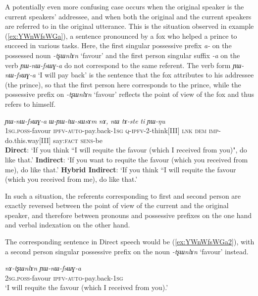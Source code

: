 \documentclass[oneside,a4paper,11pt]{article}
\newcommand{\ipa}[1]{\textit{\phon#1}}
\newcommand{\jpg}[2]{\ipa{#1} `#2'}
\newcommand{\bleu}[1]{{\color{blue}#1}}
\newcommand{\rouge}[1]{{\color{red}#1}}
\newcommand{\refb}[1]{(\ref{#1})}
\begin{document}
A potentially even more confusing case occurs when the original speaker is the current speakers' addressee, and when both the original and the current speakers are referred to in the original utterance. This is the situation observed in example \refb{ex:YWnWfsWGa}, a sentence pronounced by a fox who helped a prince to succeed in various tasks. Here,  the first singular possessive prefix \ipa{a-} on the possessed noun \jpg{-tʂɯnlɤn}{favour} and the first person singular suffix \ipa{-a} on the verb \ipa{ɲɯ-nɯ-fsɯɣ-a} do not correspond to the same referent. The verb form \ipa{ɲɯ-nɯ-fsɯɣ-a} `I will pay back' is the sentence that the fox attributes to his addressee (the prince), so that the first person here corresponds to the prince, while the possessive prefix on \jpg{-tʂɯnlɤn}{favour} reflects the point of view of the fox and thus refers to himself.

 \begin{exe}
 \ex \label{ex:YWnWfsWGa}
 \gll   \rouge{\ipa{a-tʂɯnlɤn}}  	\bleu{\ipa{ɲɯ-nɯ-fsɯɣ-a}}  	\ipa{ɯ-ɲɯ-tɯ-sɯsɤm}  	\ipa{nɤ,}  	\ipa{nɯ}  	\ipa{tɤ-ste}  	\ipa{ti}  \ipa{ɲɯ-ŋu} \\
  {\textsc{1sg.poss}-favour} {\textsc{ipfv-auto}-pay.back-\textsc{1sg}} \textsc{q-ipfv}-2-think[III] \textsc{lnk} \textsc{dem} \textsc{imp}-do.this.way[III] say:\textsc{fact} \textsc{sens}-be \\
\glt    \textbf{Direct}: `If you think ``\bleu{I will requite the favour (which I received from you)}", do like that.'
\glt    \textbf{Indirect}: `If you want to \rouge{requite the favour (which you received from me}), do like that.'
\glt   \textbf{Hybrid Indirect}: `If you think ``\bleu{I will requite} the \rouge{favour (which you received from me}), do like that.'
\end{exe}
In such a situation, the referents corresponding to first and second person are exactly reversed between the point of view of the current and the original speaker, and therefore between pronouns and possessive prefixes on the one hand and verbal indexation on the other hand.
   
The corresponding sentence in Direct speech would be \refb{ex:YWnWfsWGa2}, with a second person singular possessive prefix on the noun  \jpg{-tʂɯnlɤn}{favour} instead.

\begin{exe}
\ex \label{ex:YWnWfsWGa2}
 \gll  \ipa{nɤ-tʂɯnlɤn}  	\ipa{ɲɯ-nɯ-fsɯɣ-a} \\
  {\textsc{2sg.poss}-favour} {\textsc{ipfv-auto}-pay.back-\textsc{1sg}} \\ 
 \glt `I will requite the favour (which I received from you).'
\end{exe}
\end{document}
